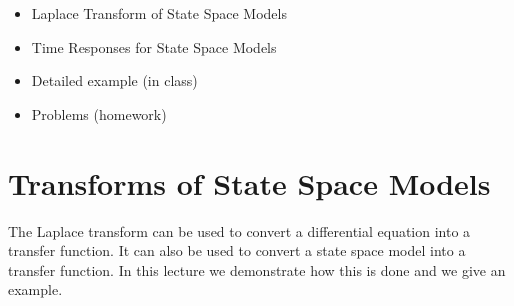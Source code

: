 \def\FileDate{99/10/06}
\def\FileVersion{1.2}

\begin{slide}
   \begin{itemize}
   	\item Laplace Transform of State Space Models
   	\item Time Responses for State Space Models
    \item Detailed example (in class)
   	\item Problems (homework)
   \end{itemize}
\end{slide}

\section*{Transforms of State Space Models} %
\label{sec:transforms_of_state_space_models}

The Laplace transform can be used to convert a differential equation
into a transfer function. It can also be used to convert a state space
model into a transfer function. In this lecture we demonstrate how
this is done and we give an example.

\ifslidesonly
\begin{slide}
  
\end{slide}
\fi


\ifslidesonly
\begin{slide}
  
\end{slide}
\fi


\ifslidesonly
\begin{slide}
  
\end{slide}
\fi

\ifslidesonly
  \begin{slide}
    
  \end{slide}
\fi


